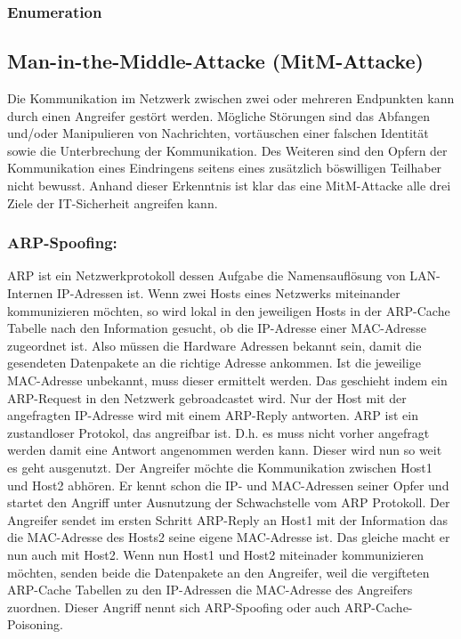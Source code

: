 \subsubsection{Enumeration}

\subsection{Man-in-the-Middle-Attacke (MitM-Attacke)}
Die Kommunikation im Netzwerk zwischen zwei oder mehreren Endpunkten kann durch einen Angreifer gestört werden. Mögliche Störungen sind das Abfangen und/oder Manipulieren von Nachrichten, vortäuschen einer falschen Identität sowie die Unterbrechung der Kommunikation.\cite{ref_book_attack_1} Des Weiteren sind den Opfern der Kommunikation eines Eindringens seitens eines zusätzlich böswilligen Teilhaber nicht bewusst. Anhand  dieser Erkenntnis ist klar das eine MitM-Attacke alle drei Ziele der IT-Sicherheit angreifen kann. \cite{ref_ieee_attack_8}\par

\subsubsection{ARP-Spoofing:}
ARP ist ein Netzwerkprotokoll dessen Aufgabe die Namensauflösung von LAN-Internen IP-Adressen ist. Wenn zwei Hosts eines Netzwerks miteinander kommunizieren möchten, so wird lokal in den jeweiligen Hosts in der ARP-Cache Tabelle nach den Information gesucht, ob die IP-Adresse einer MAC-Adresse zugeordnet ist. Also müssen die Hardware Adressen bekannt sein, damit die gesendeten Datenpakete an die richtige Adresse ankommen.\cite{ref_ieee_attack_8}\cite{ref_url11} Ist die jeweilige MAC-Adresse unbekannt, muss dieser ermittelt werden. Das geschieht indem ein ARP-Request in den Netzwerk gebroadcastet wird. Nur der Host mit der angefragten IP-Adresse wird mit einem ARP-Reply antworten. ARP ist ein zustandloser Protokol, das angreifbar ist. D.h. es muss nicht vorher angefragt werden damit eine Antwort angenommen werden kann. Dieser wird nun so weit es geht ausgenutzt. Der Angreifer möchte die Kommunikation zwischen Host1 und Host2 abhören. Er kennt schon die IP- und MAC-Adressen seiner Opfer und startet den Angriff unter Ausnutzung der Schwachstelle vom ARP Protokoll. Der Angreifer sendet im ersten Schritt ARP-Reply an Host1 mit der Information das die MAC-Adresse des Hosts2 seine eigene MAC-Adresse ist. Das gleiche macht er nun auch mit Host2. Wenn nun Host1 und Host2 miteinader kommunizieren möchten, senden beide die Datenpakete an den Angreifer, weil die vergifteten ARP-Cache Tabellen zu den IP-Adressen die MAC-Adresse des Angreifers zuordnen. Dieser Angriff nennt sich ARP-Spoofing oder auch ARP-Cache-Poisoning.\cite{ref_ieee_attack_8} \cite{ref_url11} \par


